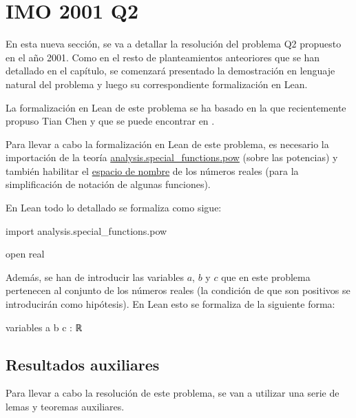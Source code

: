 \section{IMO 2001 Q2}
En esta nueva sección, se va a detallar la resolución del problema
Q2 propuesto en el año 2001. Como en el resto de planteamientos
anteoriores que se han detallado en el capítulo, se comenzará
presentado la demostración en lenguaje natural del problema y
luego su correspondiente formalización en Lean.

La formalización en Lean de este problema se ha basado en la que
recientemente propuso Tian Chen y que se puede  encontrar en
\cite{TCC}.

\noindent
{}

Para llevar a cabo la formalización en Lean de este problema, es
necesario la importación de la teoría
\href{https://github.com/leanprover-community/mathlib/blob/master/src/analysis/special_functions/pow.lean}
{analysis.special\_functions.pow} (sobre las potencias) y también
habilitar el \href{https://leanprover.github.io/reference/other_commands.html#namespaces}
{espacio de nombre} de los números reales (para la simplificación
de notación de algunas funciones).

En Lean todo lo detallado se formaliza como sigue:
\begin{leancode}
import analysis.special_functions.pow

open real
\end{leancode}

Además, se han de introducir las variables \(a\), \(b\) y \(c\) que
en este problema pertenecen al conjunto de los números reales (la
condición de que son positivos se introducirán como hipótesis).
En Lean esto se formaliza de la siguiente forma:
\begin{leancode}
variables {a b c : ℝ}
\end{leancode}

\subsection{Resultados auxiliares}
Para llevar a cabo la resolución de este problema, se van a utilizar
una serie de lemas y teoremas auxiliares.

